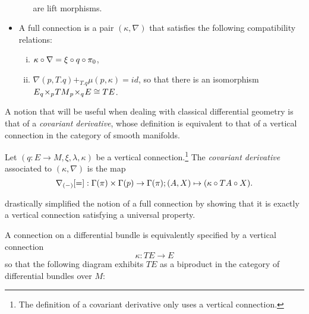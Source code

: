 \begin{definition}
\begin{itemize}
\begin{enumerate}[(i)]
\begin{gather*}
      \end{gather*}
       are lift morphisms.
    \end{enumerate}
    \item A full connection is a pair $(\kappa,\nabla)$ that satisfies the following compatibility relations:
    \begin{enumerate}[(i)]
      \item $\kappa \circ \nabla = \xi \circ q \circ \pi_0$,
      \item $\nabla(p, T.q) +_{T.q} \mu(p, \kappa) = id$, so that there is an isomorphism $E {_{q}}\!\times_{p}\! TM {_{p}}\!\times_{q}\! E \cong TE$. 
    \end{enumerate}
    
  \end{itemize}
\end{definition}
A notion that will be useful when dealing with classical differential geometry is that of a \emph{covariant derivative}, whose definition is equivalent to that of a vertical connection in the category of smooth manifolds.
\begin{definition}%
  \label{def:covariant-derivative}
  Let $(q:E \to M, \xi, \lambda, \kappa)$ be a vertical connection.\footnote{
     The definition of a covariant derivative only uses a vertical connection.
  }
  The \emph{covariant derivative} associated to $(\kappa,\nabla)$ is the map
  \[
      \nabla_{(-)}[=]:\Gamma(\pi) \times \Gamma(p) \to \Gamma(\pi); (A,X) \mapsto (\kappa \circ TA \circ X).
  \]
\end{definition}
\cite{LucyshynWright2018} drastically simplified the notion of a full connection by showing that it is exactly a vertical connection satisfying a universal property.
\begin{proposition}\label{prop:rory-connection}
  A connection on a differential bundle is equivalently specified by a vertical connection \[\kappa:TE \to E\] so that the following diagram exhibits $TE$ as a biproduct in the category of differential bundles over $M$:
  
\end{proposition}
